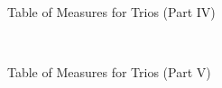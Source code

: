 \documentclass[a4paper,x11names,svgnames,10pt]{article}
\begin{document}
\newpage
${}_{}$\\
\vspace{0.10in}
\begin{figure}[H]
	\centering
	\def\svgwidth{0.975\columnwidth}
	
	\caption{Table of Measures for Trios (Part IV)}
	\label{fig:meas4}
\end{figure}

\newpage
${}_{}$\\
\vspace{0.10in}
\begin{figure}[H]
	\centering
	\def\svgwidth{0.975\columnwidth}
	
	\caption{Table of Measures for Trios (Part V)}
	\label{fig:meas5}
\end{figure}


\newpage
\end{document}
